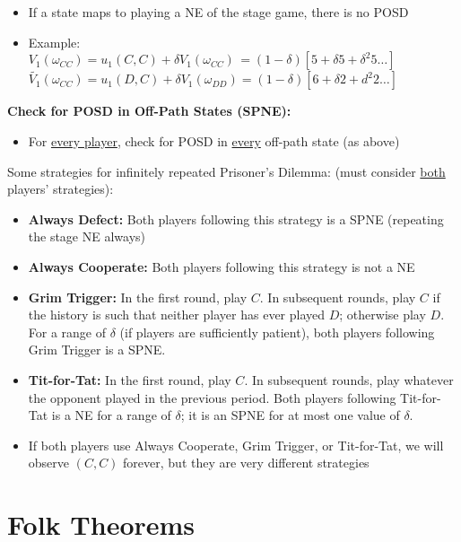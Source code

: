 \documentclass{report}
\begin{document}
\begin{mdframed}
\begin{itemize}
			\item If a state maps to playing a NE of the stage game, there is no POSD
			\item Example:\\[5pt]
			$V_1(\omega_{CC}) = u_1(C,C) + \delta V_1(\omega_{CC}) \hspace{2pt} = (1 - \delta)  \left[ 5 + \delta 5 + \delta^2 5 \dots \right]$ \\[10pt]
			$\widetilde{V_1}(\omega_{CC}) = u_1(D,C) + \delta V_1(\omega_{DD}) = (1 - \delta) \left[ 6 + \delta 2 + d^2 2 \dots \right]$ 
		\end{itemize}
	\textbf{Check for POSD in Off-Path States (SPNE):}
		\begin{itemize}
			\item For \underline{every player}, check for POSD in \underline{every} off-path state (as above)
		\end{itemize}
	\smallskip
\end{mdframed}
\bigskip

Some strategies for infinitely repeated Prisoner's Dilemma: (must consider \underline{both} players' strategies):
\begin{itemize}
	\item \textbf{Always Defect:} Both players following this strategy is a SPNE (repeating the stage NE always)
	\item \textbf{Always Cooperate:} Both players following this strategy is not a NE
	\item \textbf{Grim Trigger:} In the first round, play $C$. In subsequent rounds, play $C$ if the history is such that neither player has ever played $D$; otherwise play $D$. For a range of $\delta$ (if players are sufficiently patient), both players following Grim Trigger is a SPNE.
	\item \textbf{Tit-for-Tat:} In the first round, play $C$. In subsequent rounds, play whatever the opponent played in the previous period. Both players following Tit-for-Tat is a NE for a range of $\delta$; it is an SPNE for at most one value of $\delta$.
	\item If both players use Always Cooperate, Grim Trigger, or Tit-for-Tat, we will observe $(C,C)$ forever, but they are very different strategies
\end{itemize}

\section*{Folk Theorems}\medskip
\end{document}

